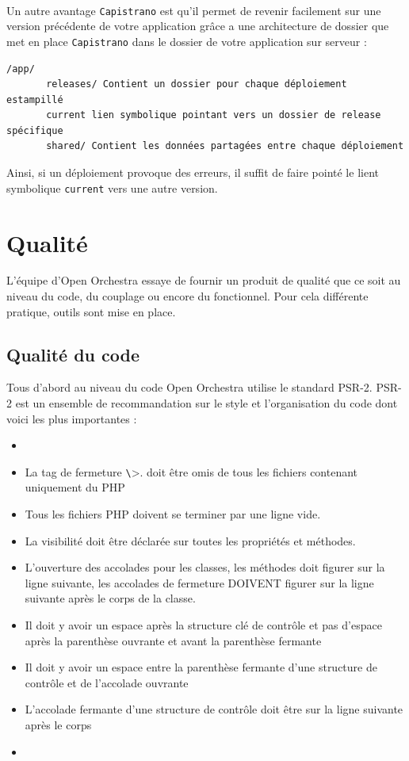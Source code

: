 \paragraph{}
Un autre avantage \verb?Capistrano? est qu'il permet de revenir facilement sur une version précédente de votre application grâce a une architecture de dossier que met en place \verb?Capistrano? dans le dossier de votre application sur serveur : 
\begin{verbatim}
/app/
       releases/ Contient un dossier pour chaque déploiement estampillé
       current lien symbolique pointant vers un dossier de release spécifique
       shared/ Contient les données partagées entre chaque déploiement
\end{verbatim}
Ainsi, si un déploiement provoque des erreurs, il suffit de faire pointé le lient symbolique \verb?current? vers une autre version.

\section{Qualité}
L'équipe d'Open Orchestra essaye de fournir un produit de qualité que ce soit au niveau du code, du couplage ou encore du fonctionnel. Pour cela différente pratique, outils sont mise en place.
\subsection{Qualité du code}
Tous d'abord au niveau du code Open Orchestra utilise le standard PSR-2. PSR-2 est un ensemble de recommandation sur le style et l'organisation du code dont voici les plus importantes : 
\begin{itemize}
\item[]
\item La tag de fermeture \verb?\?>. doit être omis de tous les fichiers contenant uniquement du PHP
\item Tous les fichiers PHP doivent se terminer par une ligne vide.
\item La visibilité doit être déclarée sur toutes les propriétés et méthodes.
\item L'ouverture des accolades pour les classes, les méthodes doit figurer sur la ligne suivante, les accolades de fermeture DOIVENT figurer sur la ligne suivante après le corps de la classe.
\item Il doit y avoir un espace après la structure clé de contrôle et pas d'espace après la parenthèse ouvrante et avant la parenthèse fermante
\item Il doit y avoir un espace entre la parenthèse fermante d'une structure de contrôle et de l'accolade
 ouvrante
 \item L'accolade fermante d'une structure de contrôle doit être sur la ligne suivante après le corps
 \item[]
\end{itemize}
